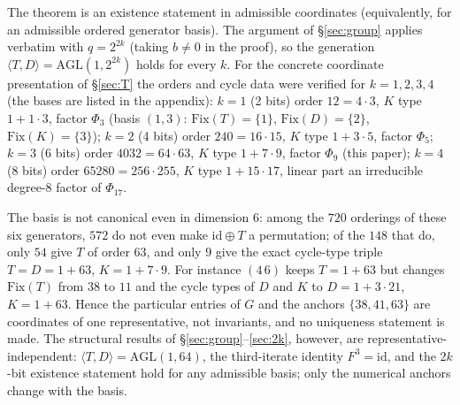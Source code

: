\documentclass[11pt]{article}
\begin{document}
The theorem is an existence statement in admissible coordinates (equivalently, for an
admissible ordered generator basis). The argument of \S\ref{sec:group} applies verbatim
with $q=2^{2k}$ (taking $b\ne0$ in the proof), so the generation
$\langle T,D\rangle=\mathrm{AGL}(1,2^{2k})$ holds for every $k$. For the concrete
coordinate presentation of \S\ref{sec:T} the orders and cycle data were verified
for $k=1,2,3,4$ (the bases are listed in the appendix):
$k=1$ (2 bits) order $12=4\cdot3$, $K$ type $1+1\cdot3$, factor
$\Phi_3$ (basis $(1,3)$: $\mathrm{Fix}(T)=\{1\}$, $\mathrm{Fix}(D)=\{2\}$,
$\mathrm{Fix}(K)=\{3\}$); $k=2$ (4 bits) order $240=16\cdot15$, $K$ type
$1+3\cdot5$, factor $\Phi_5$; $k=3$ (6 bits) order $4032=64\cdot63$, $K$ type
$1+7\cdot9$, factor $\Phi_9$ (this paper); $k=4$ (8 bits) order
$65280=256\cdot255$, $K$ type $1+15\cdot17$, linear part an irreducible degree-$8$
factor of $\Phi_{17}$.

The basis is not canonical even in dimension $6$: among the $720$ orderings of these
six generators, $572$ do not even make $\mathrm{id}\oplus T$ a permutation; of the $148$
that do, only $54$ give $T$ of order $63$, and only $9$ give the exact cycle-type triple
$T=D=1+63$, $K=1+7\cdot9$. For instance $(4\,6)$ keeps $T=1+63$ but changes
$\mathrm{Fix}(T)$ from $38$ to $11$ and the cycle types of $D$ and $K$ to $D=1+3\cdot21$,
$K=1+63$. Hence the particular entries of $G$ and the anchors $\{38,41,63\}$ are coordinates
of one representative, not invariants, and no uniqueness statement is made. The structural results of \S\ref{sec:group}--\ref{sec:2k},
however, are representative-independent: $\langle T,D\rangle=\mathrm{AGL}(1,64)$, the
third-iterate identity $F^3=\mathrm{id}$, and the $2k$-bit existence statement hold for any
admissible basis; only the numerical anchors change with the basis.
\end{document}
